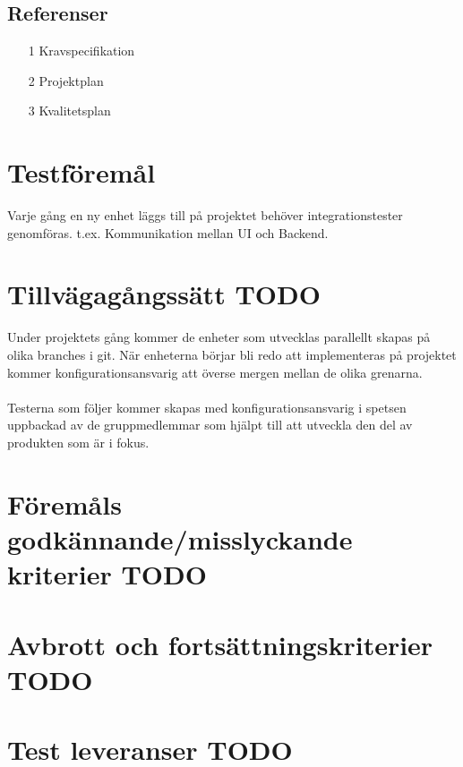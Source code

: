 \documentclass[10pt]{article}
\begin{document}
	\subsection{Referenser}
		\begin{itemize}
		\item [1] Kravspecifikation
		\item [2] Projektplan
		\item [3] Kvalitetsplan
		\end{itemize}

	
\section{Testföremål}
	Varje gång en ny enhet läggs till på projektet behöver integrationstester genomföras. t.ex. Kommunikation mellan UI och Backend.
	
	
	
	



\section{Tillvägagångssätt {\color{red}TODO}}
	Under projektets gång kommer de enheter som utvecklas parallellt skapas på olika branches i git. När enheterna börjar bli redo att implementeras på projektet kommer konfigurationsansvarig att överse mergen mellan de olika grenarna.\\
	\\
	Testerna som följer kommer skapas med konfigurationsansvarig i spetsen uppbackad av de gruppmedlemmar som hjälpt till att utveckla den del av produkten som är i fokus.


	
	

\section{Föremåls godkännande/misslyckande kriterier {\color{red}TODO}}
	


\section{Avbrott och fortsättningskriterier {\color{red}TODO}}
	


\section{Test leveranser {\color{red}TODO}}
\end{document}
